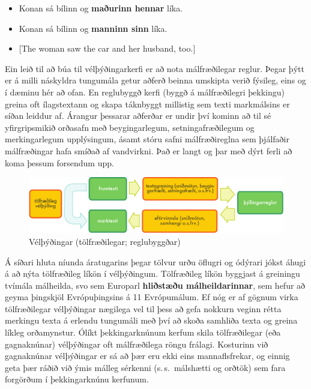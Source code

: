 \documentclass{../../metanetpaper}
\begin{document}
\begin{multicols}{2}
\begin{itemize}
\item Konan sá bílinn og \textbf{maðurinn hennar} líka.
\item Konan sá bílinn og \textbf{manninn sinn} líka.
\item {[}The woman saw the car and her husband, too.{]}
\end{itemize}

Ein leið til að búa til vélþýðingarkerfi er að nota málfræðilegar reglur. Þegar þýtt er á milli náskyldra tungumála getur aðferð beinna umskipta verið fýsileg, eins og í dæminu hér að ofan. En reglubyggð kerfi (byggð á málfræðilegri þekkingu) greina oft ílagstextann og skapa táknbyggt millistig sem texti markmálsins er síðan leiddur af. Árangur þessarar aðferðar er undir því kominn að til sé yfirgripsmikið orðasafn með beygingarlegum, setningafræðilegum og merkingarlegum upplýsingum, ásamt stóru safni málfræðireglna sem þjálfaðir málfræðingar hafa smíðað af vandvirkni. Það er langt og þar með dýrt ferli að koma þessum forsendum upp.

\begin{figure}[htb]
  \center
  \includegraphics[width=\textwidth]{../_media/icelandic/machine_translation}
  \caption{Vélþýðingar (tölfræðilegar; reglubyggðar)}
  \label{fig:mtarch_is}
\end{figure}

Á síðari hluta níunda áratugarins þegar tölvur urðu öflugri og ódýrari jókst áhugi á að nýta tölfræðileg líkön í vélþýðingum. Tölfræðileg líkön byggjast á greiningu tvímála málheilda, svo sem Europarl \textbf{hliðstæðu málheildarinnar}, sem hefur að geyma þingskjöl Evrópuþingsins á 11 Evrópumálum. Ef nóg er af gögnum virka tölfræðilegar vélþýðingar nægilega vel til þess að gefa nokkurn veginn rétta merkingu texta á erlendu tungumáli með því að skoða samhliða texta og greina líkleg orðamynstur. Ólíkt þekkingarknúnum kerfum skila tölfræðilegar (eða gagnaknúnar) vélþýðingar oft málfræðilega röngu frálagi. Kosturinn við gagnaknúnar vélþýðingar er sá að þær eru ekki eins mannaflsfrekar, og einnig geta þær ráðið við ýmis málleg sérkenni (s.\,s.~málshætti og orðtök) sem fara forgörðum í þekkingarknúnu kerfunum.


\end{multicols}
\end{document}
